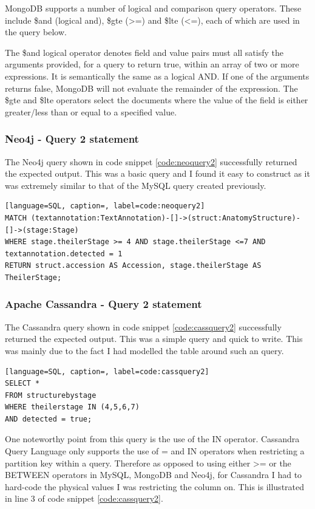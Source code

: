 MongoDB supports a number of logical and comparison query operators. These include \$and (logical and), \$gte (>=) and \$lte (<=), each of which are used in the query below.

\parindent 15pt

The \$and logical operator denotes field and value pairs must all satisfy the arguments provided, for a query to return true, within an array of two or more expressions. It is semantically the same as a logical AND. If one of the arguments returns false, MongoDB will not evaluate the remainder of the expression. The \$gte and \$lte operators select the documents where the value of the field is either greater/less than or equal to a specified value.

\subsubsection*{Neo4j - Query 2 statement}\label{neoquery2statement}
The Neo4j query shown in code snippet \ref{code:neoquery2} successfully returned the expected output. This was a basic query and I found it easy to construct as it was extremely similar to that of the MySQL query created previously.

\begin{lstlisting}[language=SQL, caption=, label=code:neoquery2]
MATCH (textannotation:TextAnnotation)-[]->(struct:AnatomyStructure)-[]->(stage:Stage)
WHERE stage.theilerStage >= 4 AND stage.theilerStage <=7 AND textannotation.detected = 1
RETURN struct.accession AS Accession, stage.theilerStage AS TheilerStage;
\end{lstlisting}

\subsubsection*{Apache Cassandra - Query 2 statement}\label{cassquery2statement}
The Cassandra query shown in code snippet \ref{code:cassquery2} successfully returned the expected output. This was a simple query and quick to write. This was mainly due to the fact I had modelled the table around such an query.

\begin{lstlisting}[language=SQL, caption=, label=code:cassquery2]
SELECT *
FROM structurebystage
WHERE theilerstage IN (4,5,6,7)
AND detected = true;
\end{lstlisting}

One noteworthy point from this query is the use of the IN operator. Cassandra Query Language only supports the use of = and IN operators when restricting a partition key within a query. Therefore as opposed to using either >= or the BETWEEN operators in MySQL, MongoDB and Neo4j, for Cassandra I had to hard-code the physical values I was restricting the column on. This is illustrated in line 3 of code snippet \ref{code:cassquery2}.

